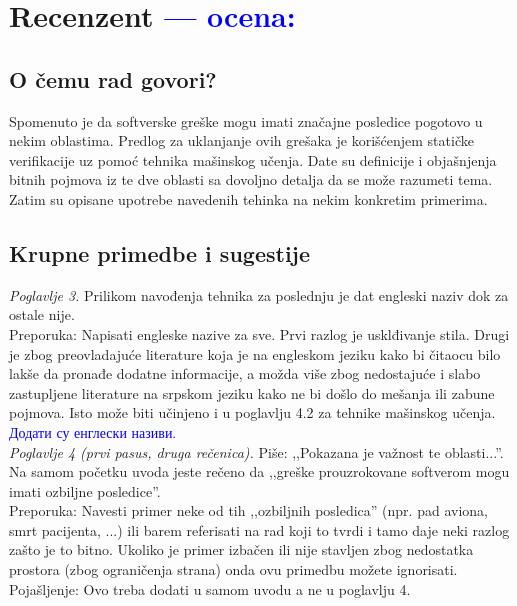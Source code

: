 \documentclass[a4paper]{report}
\newcommand{\odgovor}[1]{\textcolor{blue}{#1}}
\begin{document}
\chapter{Recenzent \odgovor{--- ocena:} }


\section{O čemu rad govori?}
Spomenuto je da softverske greške mogu imati značajne posledice pogotovo u nekim oblastima. Predlog za uklanjanje ovih grešaka je korišćenjem statičke verifikacije uz pomoć tehnika mašinskog učenja. Date su definicije i objašnjenja bitnih pojmova iz te dve oblasti sa dovoljno detalja da se može razumeti tema. Zatim su opisane upotrebe navedenih tehinka na nekim konkretim primerima.


\section{Krupne primedbe i sugestije}
\textit{Poglavlje 3.} Prilikom navođenja tehnika za poslednju je dat engleski naziv dok za ostale nije. \\
\indent Preporuka: Napisati engleske nazive za sve. Prvi razlog je usklđivanje stila. Drugi je zbog preovladajuće literature koja je na engleskom jeziku kako bi čitaocu bilo lakše da pronađe dodatne informacije, a možda više zbog nedostajuće i slabo zastupljene literature na srpskom jeziku kako ne bi došlo do mešanja ili zabune pojmova. Isto može biti učinjeno i u poglavlju 4.2 za tehnike mašinskog učenja. \\

\odgovor{Додати су енглески називи.} \\

\textit{Poglavlje 4 (prvi pasus, druga rečenica).} Piše: ,,Pokazana je važnost te oblasti...''. Na samom početku uvoda jeste rečeno da ,,greške prouzrokovane softverom mogu imati ozbiljne posledice''. \\ 
\indent Preporuka: Navesti primer neke od tih ,,ozbiljnih posledica'' (npr. pad aviona, smrt pacijenta, ...) ili barem referisati na rad koji to tvrdi i tamo daje neki razlog zašto je to bitno. Ukoliko je primer izbačen ili nije stavljen zbog nedostatka prostora (zbog ograničenja strana) onda ovu primedbu možete ignorisati. \\
\indent Pojašljenje: Ovo treba dodati u samom uvodu a ne u poglavlju 4. \\
\end{document}
